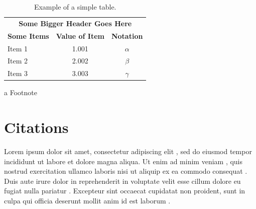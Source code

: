 \documentclass{article}
\begin{document}
\begin{table}[!ht]
    \centering
    \begin{threeparttable}
	\captionsetup{font=Large,labelfont=bf,labelsep=period}
	\caption{Example of a simple table.}
	\label{tab:example2}
	\Large
	\begin{tabular}{l|cc}
	    \hline \hline
	    \multicolumn{3}{c}{\textbf{Some Bigger Header Goes Here}} \\
	    \textbf{Some Items} & \textbf{Value of Item} & \textbf{Notation} \\
	    \hline
	    Item 1 & 1.001 & $\alpha$ \\
	    Item 2 & 2.002 & $\beta$ \\
	    Item 3 & 3.003\tnote{a} & $\gamma$ \\
	    \hline \hline
	\end{tabular}
	\begin{tablenotes}
	    \item[a] Footnote
	\end{tablenotes}
    \end{threeparttable}
\end{table}

\newpage
\section{Citations}

Lorem ipsum dolor sit amet, consectetur adipiscing elit \cite{Baranac-StojanovicAS2015}, sed do eiusmod tempor incididunt ut labore \cite{AMBER16} et dolore magna aliqua. Ut enim ad minim veniam \cite{MartinP2001}, quis nostrud exercitation ullamco laboris nisi ut aliquip ex ea commodo consequat \cite{McQuarrie1976}. Duis aute irure dolor in reprehenderit in voluptate velit esse cillum dolore eu fugiat nulla pariatur \cite{PriemTGN2010}. Excepteur sint occaecat cupidatat non proident, sunt in culpa qui officia deserunt mollit anim id est laborum \cite{R}.



\end{document}
